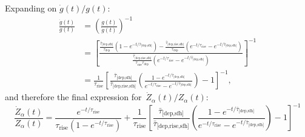 \documentclass[12pt]{article}
\newcommand{\ddfrac}[2]{\frac{\displaystyle{#1}}{\displaystyle{#2}}}
\newcommand{\timescale}[1]{\ensuremath{\tau_\text{#1}}}
\newcommand{\harmonic}[2]{\ensuremath{\bar{\tau}_\text{[#1,#2]}}}
\newcommand{\hharmonic}[3]{\ensuremath{\bar{\tau}_\text{[#1,#2,#3]}}}
\begin{document}
Expanding on $\dot{g}(t) / g(t)$:
\begin{subequations}\begin{align}
\frac{\dot{g}(t)}{g(t)} &= \left(\frac{g(t)}{\dot{g}(t)}\right)^{-1}
\\
&= \left[\ddfrac{
	\frac{
		\harmonic{dep}{sfh}
	}{
		\timescale{dep}
	} \left(1 - e^{-t / \harmonic{dep}{sfh}}\right) -
	\frac{
		\hharmonic{dep}{rise}{sfh}
	}{
		\timescale{dep}
	} \left(e^{-t / \timescale{rise}} -
	e^{-t / \harmonic{dep}{sfh}}\right)
}{
	\frac{
		\hharmonic{dep}{rise}{sfh}
	}{
		\timescale{rise}\timescale{dep}
	}
	\left(e^{-t / \timescale{rise}} - e^{-t / \harmonic{dep}{sfh}}
	\right)
}\right]^{-1}
\\
&= \frac{1}{\timescale{rise}}\left[
\frac{
	\harmonic{dep}{sfh}
}{
	\hharmonic{dep}{rise}{sfh}
}\left(
\frac{
	1 - e^{-t / \harmonic{dep}{sfh}}
}{
	e^{-t / \timescale{rise}} - e^{-t / \harmonic{dep}{sfh}}
}
\right) - 1\right]^{-1},
\end{align}\end{subequations}
and therefore the final expression for~$\dot{Z}_\alpha(t) / Z_\alpha(t)$:
\begin{equation}
\frac{\dot{Z}_\alpha(t)}{Z_\alpha(t)} = \frac{
	e^{-t / \timescale{rise}}
}{
	\timescale{rise} (1 - e^{-t / \timescale{rise}})
} + \frac{1}{\timescale{rise}} \left[
\frac{
	\harmonic{dep}{sfh}
}{
	\hharmonic{dep}{rise}{sfh}
}\left(\frac{
	1 - e^{-t / \harmonic{dep}{sfh}}
}{
	e^{-t / \timescale{rise}} - e^{-t / \harmonic{dep}{sfh}}
}\right) - 1\right]^{-1}
\end{equation}
\end{document}
